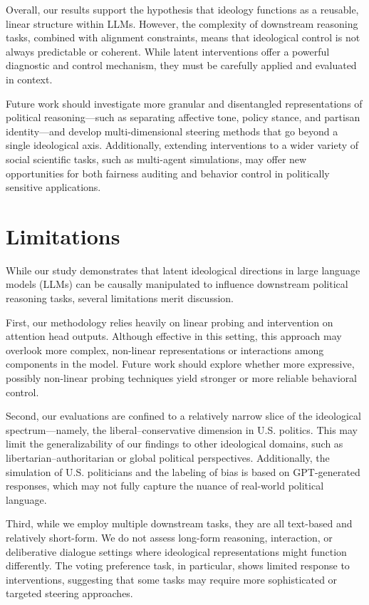 \documentclass[11pt]{article}
\begin{document}
Overall, our results support the hypothesis that ideology functions as a reusable, linear structure within LLMs. However, the complexity of downstream reasoning tasks, combined with alignment constraints, means that ideological control is not always predictable or coherent. While latent interventions offer a powerful diagnostic and control mechanism, they must be carefully applied and evaluated in context.

Future work should investigate more granular and disentangled representations of political reasoning—such as separating affective tone, policy stance, and partisan identity—and develop multi-dimensional steering methods that go beyond a single ideological axis. Additionally, extending interventions to a wider variety of social scientific tasks, such as multi-agent simulations, may offer new opportunities for both fairness auditing and behavior control in politically sensitive applications.

\section*{Limitations}

While our study demonstrates that latent ideological directions in large language models (LLMs) can be causally manipulated to influence downstream political reasoning tasks, several limitations merit discussion.

First, our methodology relies heavily on linear probing and intervention on attention head outputs. Although effective in this setting, this approach may overlook more complex, non-linear representations or interactions among components in the model. Future work should explore whether more expressive, possibly non-linear probing techniques yield stronger or more reliable behavioral control.

Second, our evaluations are confined to a relatively narrow slice of the ideological spectrum—namely, the liberal–conservative dimension in U.S. politics. This may limit the generalizability of our findings to other ideological domains, such as libertarian–authoritarian or global political perspectives. Additionally, the simulation of U.S. politicians and the labeling of bias is based on GPT-generated responses, which may not fully capture the nuance of real-world political language.

Third, while we employ multiple downstream tasks, they are all text-based and relatively short-form. We do not assess long-form reasoning, interaction, or deliberative dialogue settings where ideological representations might function differently. The voting preference task, in particular, shows limited response to interventions, suggesting that some tasks may require more sophisticated or targeted steering approaches.
\end{document}
